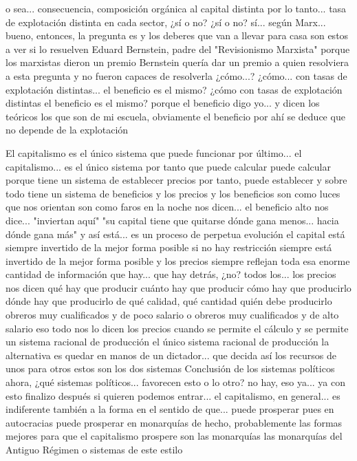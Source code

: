 o sea... consecuencia, composición orgánica al capital distinta por lo tanto...
tasa de explotación distinta en cada sector, ¿sí o no? ¿sí o no? sí...
según Marx... bueno, entonces, la pregunta es y los deberes que van a llevar para casa son estos a ver si lo resuelven
Eduard Bernstein, padre del "Revisionismo Marxista"
porque los marxistas dieron un premio Bernstein quería dar un premio a quien resolviera a esta pregunta y no fueron capaces de resolverla ¿cómo...?
¿cómo... con tasas de explotación distintas... el beneficio es el mismo?
¿cómo con tasas de explotación distintas el beneficio es el mismo?
porque el beneficio digo yo... y dicen los teóricos los que son de mi escuela, obviamente
el beneficio por ahí se deduce que no depende de la explotación

El capitalismo es el único sistema que puede funcionar
por último... el capitalismo... es el único sistema por tanto que puede calcular
puede calcular porque tiene un sistema de establecer precios por tanto, puede establecer y sobre todo tiene un sistema de beneficios
y los precios y los beneficios son como luces que nos orientan son como faros en la noche
nos dicen... el beneficio alto nos dice... "inviertan aquí" "su capital tiene que quitarse dónde gana menos...
hacia dónde gana más" y así está... es un proceso de perpetua evolución el capital está siempre invertido de la mejor forma posible
si no hay restricción siempre está invertido de la mejor forma posible y los precios siempre reflejan
toda esa enorme cantidad de información que hay... que hay detrás, ¿no? todos los...
los precios nos dicen qué hay que producir cuánto hay que producir cómo hay que producirlo
dónde hay que producirlo de qué calidad, qué cantidad quién debe producirlo obreros muy cualificados y de poco salario
o obreros muy cualificados y de alto salario eso todo nos lo dicen los precios cuando se permite el cálculo y se permite un sistema racional de producción
el único sistema racional de producción la alternativa es quedar en manos de un dictador...
que decida así los recursos de unos para otros estos son los dos sistemas
Conclusión de los sistemas políticos
ahora, ¿qué sistemas políticos... favorecen esto o lo otro? no hay, eso ya... ya con esto finalizo
después si quieren podemos entrar... el capitalismo, en general...
es indiferente también a la forma en el sentido de que... puede prosperar pues en autocracias
puede prosperar en monarquías de hecho, probablemente las formas mejores
para que el capitalismo prospere son las monarquías las monarquías del Antiguo Régimen o sistemas de este estilo
